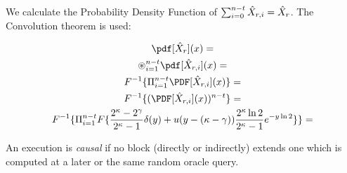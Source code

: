 We calculate the Probability Density Function of $\sum_{i=0}^{n-t}{\hat X_{r,i}} = \hat X_r$.
The Convolution theorem is used:

\begin{gather*}
  \pdf[\HX_r](x) = \\
  \circledast_{i=1}^{n-t}\pdf[\HX_{r,i}](x) = \\
  F^{-1}\{\Pi_{i=1}^{n-t}\PDF[\HX_{r,i}](x)\} = \\
  F^{-1}\{(\PDF[\HX_{r,i}](x))^{n - t}\} = \\
  F^{-1}\{\Pi_{i=1}^{n-t} F\{\frac{2^\kappa - 2^\gamma}{2^\kappa - 1} \delta(y) + u(y - (\kappa - \gamma)) \frac{2^{\kappa} \ln 2}{2^\kappa - 1} e^{-y\ln2}\} \} = \\
\end{gather*}





\begin{definition}[Causality]
  An execution is \emph{causal} if no block (directly or indirectly) extends
  one which is computed at a later or the same random oracle query.
\end{definition}

